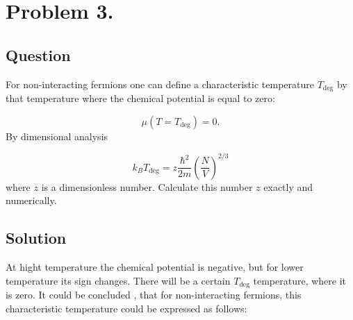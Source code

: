 \section*{Problem 3.}
\subsection*{Question}
For non-interacting fermions one can define a characteristic temperature $T_{\text{deg}}$ by that temperature where the chemical potential is equal to zero:

\begin{equation*}
\mu \left( T = T_{\text{deg}} \right) = 0.
\end{equation*}
By dimensional analysis

\begin{equation*}
k_{B} T_{\text{deg}}
=
z \frac{\hbar^{2}}{2m} \left( \frac{N}{V} \right)^{2/3}
\end{equation*}
where $z$ is a dimensionless number. Calculate this number $z$ exactly and numerically.

\subsection*{Solution}
At hight temperature the chemical potential is negative, but for lower temperature its sign changes. There will be a certain $T_{\text{deg}}$ temperature, where it is zero. It could be concluded \citep{Lee1990}, that for non-interacting fermions, this characteristic temperature could be expressed as follows:

